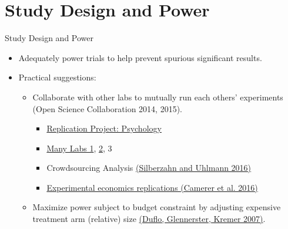 \documentclass{beamer}
\begin{document}
\section{Study Design and Power}
\begin{frame}{Study Design and Power}
\begin{itemize}[<+->]
\item
Adequately power trials to help prevent spurious significant results. 
\item
Practical suggestions:
\begin{itemize}
\item
Collaborate with other labs to mutually run each others' experiments (Open Science Collaboration 2014, 2015).
\begin{itemize}[<.->]
\item \href{http://science.sciencemag.org/content/349/6251/aac4716.full}{Replication Project: Psychology}
\item \href{http://econtent.hogrefe.com/doi/full/10.1027/1864-9335/a000178}{Many Labs 1}, \href{https://osf.io/8cd4r/}{2}, 3
\item Crowdsourcing Analysis \href{http://www.nature.com/news/crowdsourced-research-many-hands-make-tight-work-1.18508}{(Silberzahn and Uhlmann 2016)}
\item \href{http://science.sciencemag.org/content/early/2016/03/02/science.aaf0918}{Experimental economics replications (Camerer et al. 2016)}
\end{itemize}
\item
Maximize power subject to budget constraint by adjusting expensive treatment arm (relative) size \href{http://citeseerx.ist.psu.edu/viewdoc/download?doi=10.1.1.650.9734&rep=rep1&type=pdf}{(Duflo, Glennerster, Kremer 2007)}. 
\end{itemize}
\end{itemize}
\end{frame}
\end{document}
